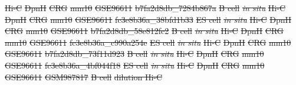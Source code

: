 \documentclass[a4,center,fleqn]{NAR}
\providecommand{\DIFdel}[1]{{\protect\color{red}\sout{#1}}}                      %
\providecommand{\DIFdelFL}[1]{\DIFdel{#1}} %
\begin{document}
\DIFdelFL{Hi-C }%
\DIFdelFL{DpnII }%
\DIFdelFL{CRG }%
\DIFdelFL{mm10 }%
\DIFdelFL{GSE96611 }%
\DIFdelFL{b7fa2d8db\_7284b867a }%
\DIFdelFL{B cell  }%
\textit{\DIFdelFL{in situ}} %
\DIFdelFL{Hi-C }%
\DIFdelFL{DpnII }%
\DIFdelFL{CRG }%
\DIFdelFL{mm10 }%
\DIFdelFL{GSE96611 }%
\DIFdelFL{fc3e8b36a\_38bfd1b33 }%
\DIFdelFL{ES cell }%
\textit{\DIFdelFL{in situ}} %
\DIFdelFL{Hi-C }%
\DIFdelFL{DpnII }%
\DIFdelFL{CRG }%
\DIFdelFL{mm10 }%
\DIFdelFL{GSE96611 }%
\DIFdelFL{b7fa2d8db\_58e812fc2 }%
\DIFdelFL{B cell  }%
\textit{\DIFdelFL{in situ}} %
\DIFdelFL{Hi-C }%
\DIFdelFL{DpnII }%
\DIFdelFL{CRG }%
\DIFdelFL{mm10 }%
\DIFdelFL{GSE96611 }%
\DIFdelFL{fc3e8b36a\_c990a254e }%
\DIFdelFL{ES cell }%
\textit{\DIFdelFL{in situ}} %
\DIFdelFL{Hi-C }%
\DIFdelFL{DpnII }%
\DIFdelFL{CRG }%
\DIFdelFL{mm10 }%
\DIFdelFL{GSE96611 }%
\DIFdelFL{b7fa2d8db\_73f11d923 }%
\DIFdelFL{B cell  }%
\textit{\DIFdelFL{in situ}} %
\DIFdelFL{Hi-C }%
\DIFdelFL{DpnII }%
\DIFdelFL{CRG }%
\DIFdelFL{mm10 }%
\DIFdelFL{GSE96611 }%
\DIFdelFL{fc3e8b36a\_4bf044f18 }%
\DIFdelFL{ES cell }%
\textit{\DIFdelFL{in situ}} %
\DIFdelFL{Hi-C }%
\DIFdelFL{DpnII }%
\DIFdelFL{CRG }%
\DIFdelFL{mm10 }%
\DIFdelFL{GSE96611 }%
\DIFdelFL{GSM987817 }%
\DIFdelFL{B cell  }%
\DIFdelFL{dilution Hi-C }%
\end{document}
